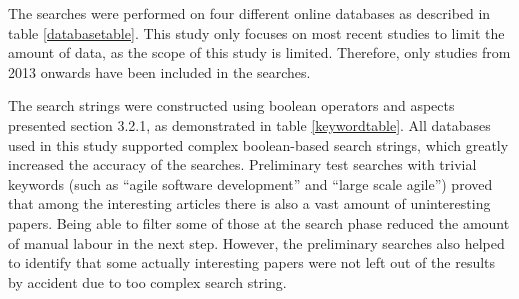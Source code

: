 The searches were performed on four different online databases as
described in table \ref{databasetable}\@. This study only focuses on most recent studies to limit
the amount of data, as the scope of this study is limited. Therefore, only
studies from 2013 onwards have been included in the searches.


\vspace{1cm}

The search strings were constructed using boolean operators and aspects
presented section 3.2.1, as demonstrated in table \ref{keywordtable}\@. All databases
used in this study supported complex boolean-based search strings,
which greatly increased the accuracy of the searches. Preliminary test
searches with trivial keywords (such as ``agile software development'' and
``large scale agile'') proved that among the interesting articles there is
also a vast amount of uninteresting papers. Being able to filter some
of those at the search phase reduced the amount of manual labour in the
next step. However, the preliminary searches also helped to identify
that some actually interesting papers were not left out of the results
by accident due to too complex search string.

\medskip

\medskip
